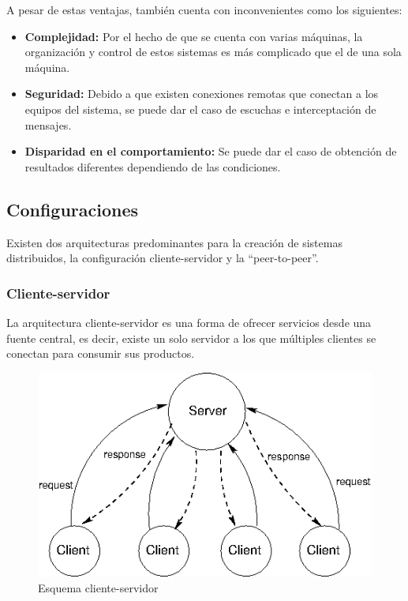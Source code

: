 A pesar de estas ventajas, también cuenta con inconvenientes como los siguientes:

\begin{itemize}
\item \textbf{Complejidad:} Por el hecho de que se cuenta con varias máquinas, la organización y control de estos sistemas es más complicado que el de una sola máquina.

\item \textbf{Seguridad:} Debido a que existen conexiones remotas que conectan a los equipos del sistema, se puede dar el caso de escuchas e interceptación de mensajes.

\item \textbf{Disparidad en el comportamiento:} Se puede dar el caso de obtención de resultados diferentes dependiendo de las condiciones.
\end{itemize}

\subsection{Configuraciones}
Existen dos arquitecturas predominantes para la creación de sistemas distribuidos, la configuración cliente-servidor y la ``peer-to-peer''.

\subsubsection{Cliente-servidor}
La arquitectura cliente-servidor es una forma de ofrecer servicios desde una fuente central, es decir, existe un solo servidor a los que múltiples clientes se conectan para consumir sus productos. 

\begin{figure}[htp!]
	\centering
	\caption{Esquema cliente-servidor  \cite{computacionDistribuidad}}
	\label{clientserver}
	\vspace{5pt}
	\includegraphics[scale=0.6]{graphics/clientserver}
\end{figure}

